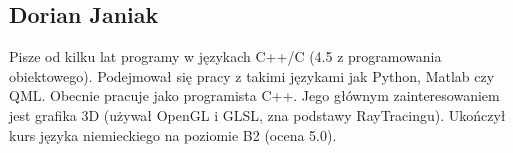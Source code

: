 \subsection{Dorian Janiak}
Pisze od kilku lat programy w językach C++/C (4.5 z programowania obiektowego). Podejmował się pracy z takimi językami jak Python, Matlab czy QML. Obecnie pracuje jako programista C++. Jego głównym zainteresowaniem jest grafika 3D (używał OpenGL i GLSL, zna podstawy RayTracingu). Ukończył kurs języka niemieckiego na poziomie B2 (ocena 5.0).
